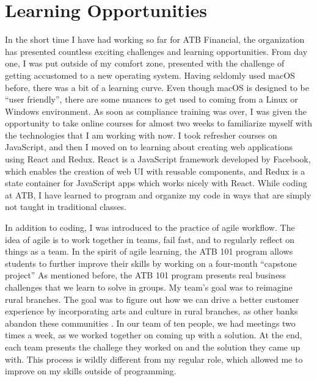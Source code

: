 \documentclass[letterpaper,12pt]{article}
\begin{document}


\section{Learning Opportunities}

In the short time I have had working so far for ATB Financial, the organization has presented
countless exciting challenges and learning opportunities.
From day one, I was put outside of my comfort zone, presented with the challenge of
getting accustomed to a new operating system. Having seldomly used macOS before,
there was a bit of a learning curve. Even though macOS is designed to be ``user friendly'',
there are some nuances to get used to coming from a Linux or Windows environment.
As soon as compliance training was over, I was given the opportunity to take online
courses for almost two weeks to familiarize myself with the technologies that I am
working with now. I took refresher courses on JavaScript, and then I moved on to learning
about creating web applications using React and Redux. React is a JavaScript framework developed by Facebook,
which enables the creation of web UI with reusable components\cite{react}, and Redux is a state container
for JavaScript apps\cite{redux} which works nicely with React. While coding at ATB,
I have learned to program and organize my code in ways that are simply not taught in traditional
classes.


In addition to coding, I was introduced to the practice of agile workflow. The idea of agile is to work together
in teams, fail fast, and to regularly reflect on things as a team.\cite{agile} In the spirit of agile learning, the ATB 101
program allows students to further improve their skills by working on a four-month ``capstone project''
As mentioned before, the ATB 101 program presents real business challenges that we learn to
solve in groups. My team's goal was to reimagine rural branches. The goal was to figure out
how we can drive a better customer experience by incorporating arts and culture in rural branches,
as other banks abandon these communities \cite{saskbranches}. In our team of ten people,
we had meetings two times a week, as we worked together on coming up with a solution.
At the end, each team presents the challege they worked on and the solution they came up with.
This process is wildly different from my regular role, which allowed me to improve on my 
skills outside of programming.
\end{document}
